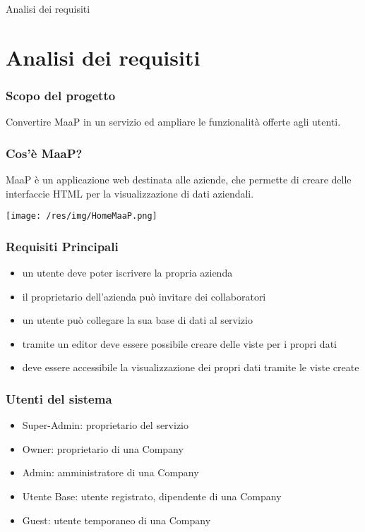 

\begin{frame}

\begin{center}
    \huge Analisi dei requisiti
\end{center}

\end{frame}

\section{Analisi dei requisiti}
\begin{frame}
  \frametitle{Scopo del progetto}

  \begin{center}
    Convertire MaaP in un servizio ed ampliare le funzionalità offerte agli utenti.
  \end{center}
\end{frame}

\begin{frame}
  \frametitle{Cos'è MaaP?}

  MaaP è un applicazione web destinata alle aziende, che permette di creare delle interfaccie HTML per la visualizzazione di dati aziendali.

  \texttt{[image: /res/img/HomeMaaP.png]}

\end{frame}

\begin{frame}
  \frametitle{Requisiti Principali}

  \begin{itemize}
  \item un utente deve poter iscrivere la propria azienda
  \item il proprietario dell'azienda può invitare dei collaboratori
  \item un utente può collegare la sua base di dati al servizio
  \item tramite un editor deve essere possibile creare delle viste per i propri dati
  \item deve essere accessibile la visualizzazione dei propri dati tramite le viste create
  \end{itemize}
\end{frame}


\begin{frame}
  \frametitle{Utenti del sistema}

  \begin{itemize}
  \item Super-Admin: proprietario del servizio
  \item Owner: proprietario di una Company
  \item Admin: amministratore di una Company
  \item Utente Base: utente registrato, dipendente di una Company
  \item Guest: utente temporaneo di una Company
  \end{itemize}

\end{frame}

